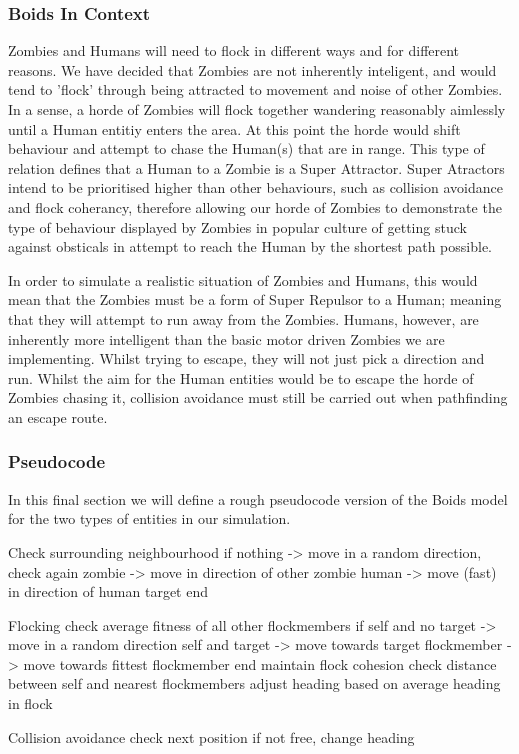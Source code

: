 \subsubsection{Boids In Context}
Zombies and Humans will need to flock in different ways and for different reasons. We have decided that Zombies are not inherently inteligent, and would tend to 'flock' through being attracted to movement and noise of other Zombies. In a sense, a horde of Zombies will flock together wandering reasonably aimlessly until a Human entitiy enters the area. At this point the horde would shift behaviour and attempt to chase the Human(s) that are in range. This type of relation defines that a Human to a Zombie is a Super Attractor. Super Atractors intend to be prioritised higher than other behaviours, such as collision avoidance and flock coherancy, therefore allowing our horde of Zombies to demonstrate the type of behaviour displayed by Zombies in popular culture of getting stuck against obsticals in attempt to reach the Human by the shortest path possible.

In order to simulate a realistic situation of Zombies and Humans, this would mean that the Zombies must be a form of Super Repulsor to a Human; meaning that they will attempt to run away from the Zombies. Humans, however, are inherently more intelligent than the basic motor driven Zombies we are implementing. Whilst trying to escape, they will not just pick a direction and run. Whilst the aim for the Human entities would be to escape the horde of Zombies chasing it, collision avoidance must still be carried out when pathfinding an escape route. 

\subsubsection{Pseudocode}
In this final section we will define a rough pseudocode version of the Boids model for the two types of entities in our simulation.

Check surrounding neighbourhood
if	nothing 	->	move in a random direction, check again
	zombie 		->	move in direction of other zombie
	human 		->	move (fast) in direction of human target
end

Flocking
	check average fitness of all other flockmembers
	if 	self and no target 	->	move in a random direction
		self and target		-> 	move towards target
		flockmember 		-> 	move towards fittest flockmember
	end
	maintain flock cohesion
		check distance between self and nearest flockmembers
		adjust heading based on average heading in flock

Collision avoidance
	check next position
		if not free, change heading

